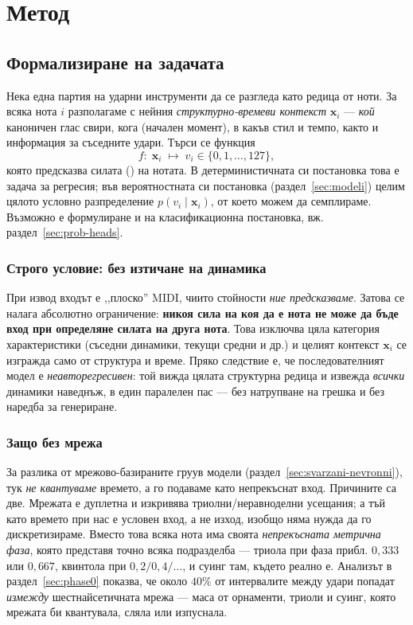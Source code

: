 \chapter{Метод}
\label{ch:metod}

\section{Формализиране на задачата}
\label{sec:formalizirane}

Нека една партия на ударни инструменти да се разгледа като редица от ноти.
За всяка нота $i$ разполагаме с
нейния \emph{структурно-времеви контекст} $\boldsymbol{x}_i$ — \emph{кой} каноничен глас свири,
кога (начален момент), в какъв стил и темпо, както и информация за съседните
удари. Търси се функция
\[
  f:\; \boldsymbol{x}_i \;\longmapsto\; v_i \in \{0,1,\dots,127\},
\]
която предсказва силата () на нотата. В детерминистичната си постановка това
е задача за регресия; във вероятностната си постановка (раздел~\ref{sec:modeli})
целим цялото условно разпределение $p(v_i \mid \boldsymbol{x}_i)$, от което можем да
семплираме. Възможно е формулиране и на класификационна постановка,
вж. раздел~\ref{sec:prob-heads}.

\subsection{Строго условие: без изтичане на динамика}
\label{sec:no-leakage}

При извод входът е ,,плоско'' MIDI, чиито  стойности \emph{ние
предсказваме}. Затова се налага абсолютно ограничение: \textbf{никоя сила
на коя да е нота не може да бъде вход при определяне силата на друга нота}. Това изключва цяла
категория характеристики (съседни динамики, текущи средни и др.) и целият
контекст $\boldsymbol{x}_i$ се изгражда само от структура и време. Пряко следствие е, че
последователният модел е \emph{неавторегресивен}: той вижда цялата структурна
редица и извежда \emph{всички} динамики наведнъж, в един паралелен пас — без
натрупване на грешка и без наредба за генериране.

\subsection{Защо без мрежа}
\label{sec:no-grid}

За разлика от мрежово-базираните груув модели (раздел~\ref{sec:svarzani-nevronni}),
тук \emph{не квантуваме} времето, а го подаваме като непрекъснат вход. Причините са две.
Мрежата е дуплетна и изкривява триолни/неравноделни усещания; а тъй
като времето при нас е условен вход, а не изход, изобщо няма нужда да го
дискретизираме. Вместо това всяка нота има своята \emph{непрекъсната метрична
фаза}, която представя точно всяка подразделба — триола при фаза прибл. $0{,}333$ или $0{,}667$,
квинтола при $0{,}2/0{,}4/\dots$, и суинг там, където реално е. Анализът в
раздел~\ref{sec:phase0} показва, че около $40\%$ от интервалите между удари
попадат \emph{измежду} шестнайсетичната мрежа — маса от орнаменти, триоли и суинг,
която мрежата би квантувала, сляла или изпуснала.

